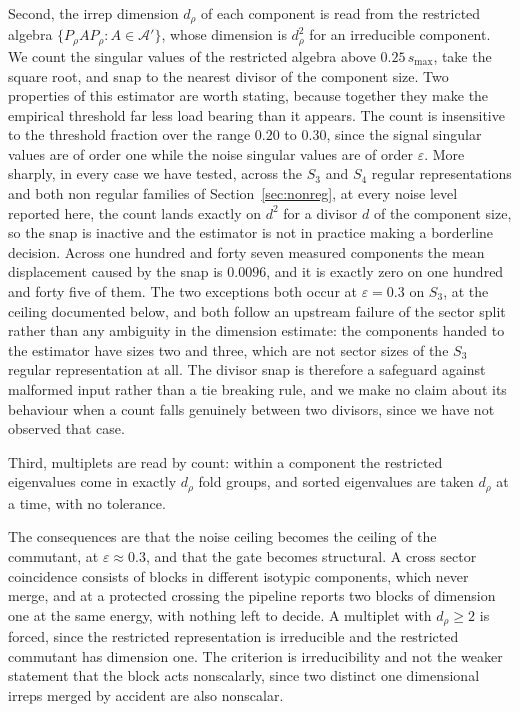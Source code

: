 \documentclass[11pt]{article}
\begin{document}
Second, the irrep dimension $d_\rho$ of each component is read from the
restricted algebra $\{P_\rho A P_\rho : A\in\mathcal{A}'\}$, whose dimension is
$d_\rho^2$ for an irreducible component. We count the singular values of the
restricted algebra above $0.25\,s_{\max}$, take the square root, and snap to the
nearest divisor of the component size. Two properties of this estimator are worth
stating, because together they make the empirical threshold far less load bearing
than it appears. The count is insensitive to the threshold fraction over the
range $0.20$ to $0.30$, since the signal singular values are of order one while
the noise singular values are of order $\varepsilon$. More sharply, in every case
we have tested, across the $S_3$ and $S_4$ regular representations and both non
regular families of Section~\ref{sec:nonreg}, at every noise level reported here,
the count lands exactly on $d^2$ for a divisor $d$ of the component size, so the
snap is inactive and the estimator is not in practice making a borderline
decision. Across one hundred and forty seven measured components the mean
displacement caused by the snap is $0.0096$, and it is exactly zero on one
hundred and forty five of them. The two exceptions both occur at
$\varepsilon=0.3$ on $S_3$, at the ceiling documented below, and both follow an
upstream failure of the sector split rather than any ambiguity in the dimension
estimate: the components handed to the estimator have sizes two and three, which
are not sector sizes of the $S_3$ regular representation at all. The divisor snap
is therefore a safeguard against malformed input rather than a tie breaking rule,
and we make no claim about its behaviour when a count falls genuinely between two
divisors, since we have not observed that case.

Third, multiplets are read by count: within a component the restricted
eigenvalues come in exactly $d_\rho$ fold groups, and sorted eigenvalues are
taken $d_\rho$ at a time, with no tolerance.

The consequences are that the noise ceiling becomes the ceiling of the commutant,
at $\varepsilon\approx0.3$, and that the gate becomes structural. A cross sector
coincidence consists of blocks in different isotypic components, which never
merge, and at a protected crossing the pipeline reports two blocks of dimension
one at the same energy, with nothing left to decide. A multiplet with
$d_\rho\ge2$ is forced, since the restricted representation is irreducible and
the restricted commutant has dimension one. The criterion is irreducibility and
not the weaker statement that the block acts nonscalarly, since two distinct one
dimensional irreps merged by accident are also nonscalar.
\end{document}
